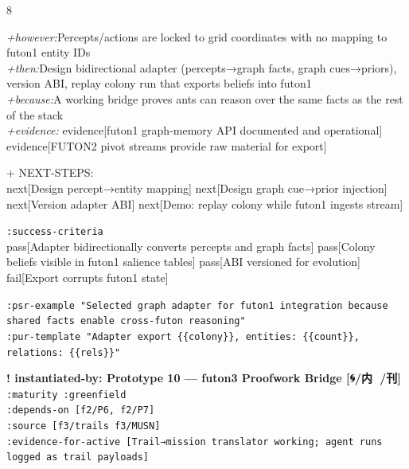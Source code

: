 \documentclass[landscape]{article}
\newcommand{\flexitag}[1]{\textcolor[gray]{0.35}{\textit{#1}}}
\newenvironment{devmapgreenfield}{%
  \def\FrameCommand{\colorbox{devmapgreenfieldbg}}%
  \setlength{\fboxsep}{2pt}%
  \MakeFramed{\advance\hsize-\width \FrameRestore}%
}{\endMakeFramed}
\begin{document}
\begin{paracol}{8}
\begin{devmapgreenfield}
  \flexitag{+however:}Percepts/actions are locked to grid coordinates with no mapping to futon1 entity IDs\\
  \flexitag{+then:}Design bidirectional adapter (percepts→graph facts, graph cues→priors), version ABI, replay colony run that exports beliefs into futon1\\
  \flexitag{+because:}A working bridge proves ants can reason over the same facts as the rest of the stack\\
  \flexitag{+evidence:} evidence[futon1 graph-memory API documented and operational] evidence[FUTON2 pivot streams provide raw material for export]\\
\par
  + NEXT-STEPS:\\
    next[Design percept→entity mapping] next[Design graph cue→prior injection] next[Version adapter ABI] next[Demo: replay colony while futon1 ingests stream]\\
\par
  \texttt{:\allowbreak{}success-\allowbreak{}criteria}\\
    pass[Adapter bidirectionally converts percepts and graph facts] pass[Colony beliefs visible in futon1 salience tables] pass[ABI versioned for evolution] fail[Export corrupts futon1 state]\\
\par
  \texttt{:\allowbreak{}psr-\allowbreak{}example "Selected graph adapter for futon1 integration because shared facts enable cross-\allowbreak{}futon reasoning"}\\
  \texttt{:\allowbreak{}pur-\allowbreak{}template "Adapter export \{\{colony\}\},\allowbreak{} entities:\allowbreak{} \{\{count\}\},\allowbreak{} relations:\allowbreak{} \{\{rels\}\}"}\\
\par
\par
\end{devmapgreenfield}
\begin{devmapgreenfield}
\textbf{! instantiated-by: Prototype 10 — futon3 Proofwork Bridge [🌀/内 🙅/刊]}\\
  \texttt{:\allowbreak{}maturity :\allowbreak{}greenfield}\\
  \texttt{:\allowbreak{}depends-\allowbreak{}on [f2/\allowbreak{}P6,\allowbreak{} f2/\allowbreak{}P7]}\\
  \texttt{:\allowbreak{}source [f3/\allowbreak{}trails f3/\allowbreak{}MUSN]}\\
  \texttt{:\allowbreak{}evidence-\allowbreak{}for-\allowbreak{}active [Trail→mission translator working;\allowbreak{} agent runs logged as trail payloads]}\\

\end{devmapgreenfield}
\end{paracol}
\end{document}
